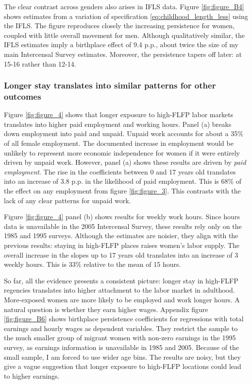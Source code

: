 The clear contrast across genders also arises in IFLS data.  Figure  \ref{fig:figure_B4} shows estimates from a variation of specification \eqref{eq:childhood_length_less} using the IFLS. The figure reproduces closely the increasing persistence for women, coupled with little overall movement for men. Although qualitatively similar, the IFLS estimates imply a birthplace effect of 9.4 p.p., about twice the size of my main Intercensal Survey estimates. Moreover, the persistence tapers off later: at 15-16 rather than 12-14.

\subsubsection{Longer stay translates into similar patterns for other outcomes}
Figure \ref{fig:figure_4} shows that longer exposure to high-FLFP labor markets translates into higher paid employment and working hours. Panel (a) breaks down employment into paid and unpaid. Unpaid work accounts for about a 35\% of all female employment. The documented increase in employment would be unlikely to represent more economic independence for women if it were entirely driven by unpaid work. However, panel (a) shows these results are driven by \emph{paid employment}. 
The rise in the coefficients between 0 and 17 years old translates into an increase of 3.8 p.p. in the likelihood of paid employment. 
This is 68\% of the effect on any employment from figure  \ref{fig:figure_3}. This contrasts with the lack of any clear patterns for unpaid work.

\tftext{}

Figure \ref{fig:figure_4}  panel (b)  shows results for weekly work hours. Since hours data is unavailable in the 2005 Intercensal Survey, these results rely only on the 1985 and 1995 surveys. Although the estimates are noisier, they align with the previous results: staying in high-FLFP places raises women's labor supply. The overall increase in the slopes up to 17 years old translates into an increase of 3 weekly hours. This is 33\% relative to the mean of 15 hours.

So far, all the evidence presents a consistent picture: longer stay in high-FLFP regencies translates into higher attachment to the labor market in adulthood. More-exposed women are more likely to be employed and work longer hours. A natural question is whether they earn higher wages. Appendix figure \ref{fig:figure_B6} shows birthplace persistence coefficients for regressions with total earnings and hourly wages as dependent variables. They restrict the sample to the much smaller group of migrant women with non-zero earnings in the 1995 survey, as earnings information is unavailable in 1985 and 2005. Because of the small sample, I am forced to use wider age bins. The results are noisy, but they give a vague suggestion that longer exposure to high-FLFP locations could lead to higher earnings. 

